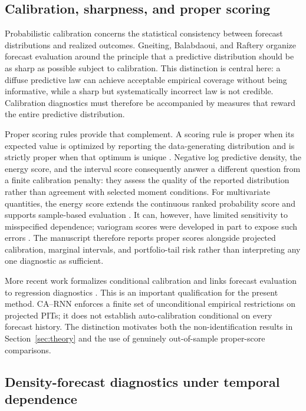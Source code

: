 \documentclass[11pt]{article}
\begin{document}
\subsection{Calibration, sharpness, and proper scoring}

Probabilistic calibration concerns the statistical consistency between forecast
distributions and realized outcomes.  Gneiting, Balabdaoui, and Raftery
\cite{gneiting2007calibration} organize forecast evaluation around the principle
that a predictive distribution should be as sharp as possible subject to
calibration.  This distinction is central here: a diffuse predictive law can
achieve acceptable empirical coverage without being informative, while a sharp
but systematically incorrect law is not credible.  Calibration diagnostics must
therefore be accompanied by measures that reward the entire predictive
distribution.

Proper scoring rules provide that complement.  A scoring rule is proper when its
expected value is optimized by reporting the data-generating distribution and is
strictly proper when that optimum is unique \cite{gneiting2007scoring}.  Negative
log predictive density, the energy score, and the interval score consequently
answer a different question from a finite calibration penalty: they assess the
quality of the reported distribution rather than agreement with selected moment
conditions.  For multivariate quantities, the energy score extends the
continuous ranked probability score and supports sample-based evaluation
\cite{gneiting2008multivariate}.  It can, however, have limited sensitivity to
misspecified dependence; variogram scores were developed in part to expose such
errors \cite{scheuerer2015variogram}.  The manuscript therefore reports proper
scores alongside projected calibration, marginal intervals, and portfolio-tail
risk rather than interpreting any one diagnostic as sufficient.

More recent work formalizes conditional calibration and links forecast
evaluation to regression diagnostics \cite{gneiting2023conditional}.  This is an
important qualification for the present method.  CA--RNN enforces a finite set of
unconditional empirical restrictions on projected PITs; it does not establish
auto-calibration conditional on every forecast history.  The distinction
motivates both the non-identification results in Section~\ref{sec:theory} and the
use of genuinely out-of-sample proper-score comparisons.

\subsection{Density-forecast diagnostics under temporal dependence}
\end{document}
